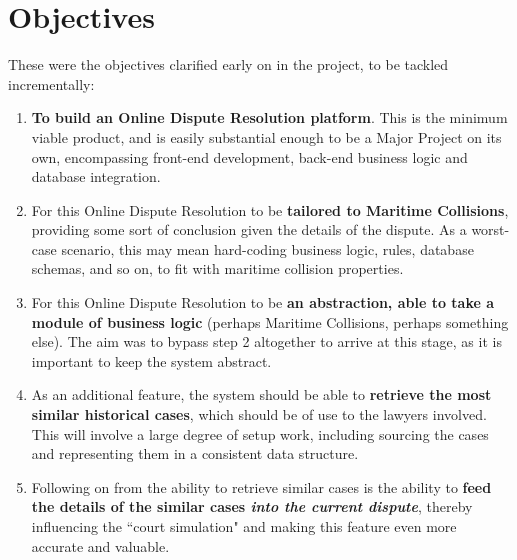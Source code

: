 \section{Objectives}

These were the objectives clarified early on in the project, to be tackled incrementally:

\begin{enumerate}

    \item \textbf{To build an Online Dispute Resolution platform}. This is the minimum viable product, and is easily substantial enough to be a Major Project on its own, encompassing front-end development, back-end business logic and database integration.
    
    \item For this Online Dispute Resolution to be \textbf{tailored to Maritime Collisions}, providing some sort of conclusion given the details of the dispute. As a worst-case scenario, this may mean hard-coding business logic, rules, database schemas, and so on, to fit with maritime collision properties.

    \item For this Online Dispute Resolution to be \textbf{an abstraction, able to take a module of business logic} (perhaps Maritime Collisions, perhaps something else). The aim was to bypass step 2 altogether to arrive at this stage, as it is important to keep the system abstract.

    \item As an additional feature, the system should be able to \textbf{retrieve the most similar historical cases}, which should be of use to the lawyers involved. This will involve a large degree of setup work, including sourcing the cases and representing them in a consistent data structure.

    \item Following on from the ability to retrieve similar cases is the ability to \textbf{feed the details of the similar cases \emph{into the current dispute}}, thereby influencing the ``court simulation" and making this feature even more accurate and valuable.

\end{enumerate}